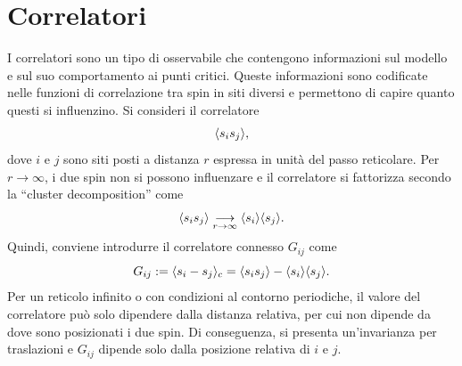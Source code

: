 \section{Correlatori}
I correlatori sono un tipo di osservabile che contengono informazioni sul modello e sul suo comportamento ai punti critici. Queste informazioni sono codificate nelle funzioni di correlazione tra spin in siti diversi e permettono di capire quanto questi si influenzino. Si consideri il correlatore
\begin{equation}
    \langle s_is_j \rangle,
\end{equation}
dove $i$ e $j$ sono siti posti a distanza $r$ espressa in unità del passo reticolare. Per $r \to \infty$, i due spin non si possono influenzare e il correlatore si fattorizza secondo la ``cluster decomposition'' come
\begin{equation}
    \langle s_i s_j \rangle \underset{r \to \infty}{\longrightarrow} \langle s_i \rangle\langle s_j \rangle.
\end{equation}
Quindi, conviene introdurre il correlatore connesso $G_{ij}$ come
\begin{equation}
    G_{ij} := \langle s_i - s_j \rangle_c = \langle s_is_j \rangle - \langle s_i \rangle\langle s_j \rangle.
\end{equation}
Per un reticolo infinito o con condizioni al contorno periodiche, il valore del correlatore può solo dipendere dalla distanza relativa, per cui non dipende da dove sono posizionati i due spin. Di conseguenza, si presenta un'invarianza per traslazioni e $G_{ij}$ dipende solo dalla posizione relativa di $i$ e $j$. 

